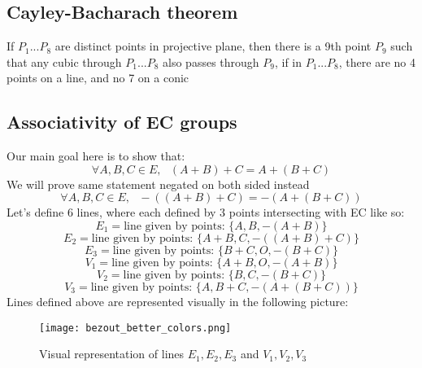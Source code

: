 \documentclass[bp,en]{FEIstyle}
\begin{document}
\subsection*{Cayley-Bacharach theorem}
If $P_1...P_8$ are distinct points in projective plane, then there is a 9th point $P_9$ such that any cubic through $P_1...P_8$ also
passes through $P_9$, if in $P_1...P_8$, there are no 4 points on a line, and no 7 on a conic

\subsection*{Associativity of EC groups}
Our main goal here is to show that: 
\[
\forall A,B,C \in E, \text{ }(A+B)+C=A+(B+C)
\]
We will prove same statement negated on both sided instead
\[
\forall A,B,C \in E, \text{ }-((A+B)+C)=-(A+(B+C))
\]
Let's define 6 lines, where each defined by 3 points intersecting with EC like so:
\[
E_1= \text{line given by points: } \{A,B,-(A+B)\}
\]
\[
E_2= \text{line given by points: } \{A+B,C,-((A+B)+C)\}
\]
\[
E_3= \text{line given by points: } \{B+C,O,-(B+C)\}
\]
\[
V_1= \text{line given by points: } \{A+B,O,-(A+B)\}
\]
\[
V_2= \text{line given by points: } \{B,C,-(B+C)\}
\]
\[
V_3= \text{line given by points: } \{A,B+C,-(A+(B+C))\}
\]
Lines defined above are represented visually in the following picture:
\begin{figure}[h!]
  \centering
  \texttt{[image: bezout\_better\_colors.png]}
  \caption{Visual representation of lines $E_1,E_2,E_3$ and $V_1,V_2,V_3$}
  \label{fig:your_label}
\end{figure}
\end{document}
